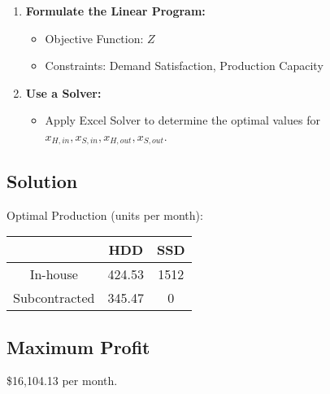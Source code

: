 \documentclass[8pt]{article}
\begin{document}
\begin{enumerate}
    \item \textbf{Formulate the Linear Program:}
    \begin{itemize}
        \item Objective Function: \( Z \)
        \item Constraints: Demand Satisfaction, Production Capacity
    \end{itemize}
    
    \item \textbf{Use a Solver:}
    \begin{itemize}
        \item Apply Excel Solver  to determine the optimal values for \( x_{H,in}, x_{S,in}, x_{H,out}, x_{S,out} \).
    \end{itemize}
\end{enumerate}

\subsection*{Solution}
Optimal Production (units per month):

\begin{tabular}{|c|c|c|}
\hline
 & HDD & SSD \\
\hline
In-house & 424.53 & 1512 \\
Subcontracted & 345.47 & 0 \\
\hline
\end{tabular}

\subsection*{Maximum Profit}
\$16,104.13 per month.

\vspace{290pt}
\end{document}
